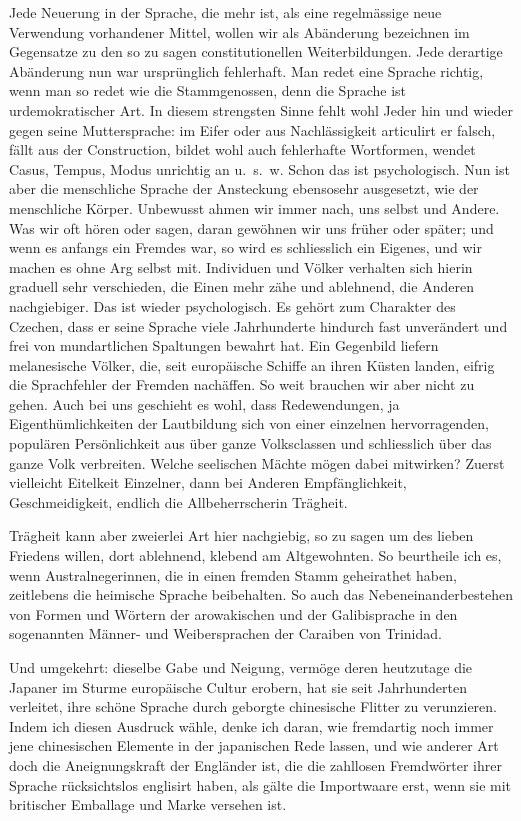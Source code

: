 Jede Neuerung in der Sprache, die mehr ist, als eine regelmässige neue Verwendung vorhandener Mittel, wollen wir als Abänderung bezeichnen im Gegensatze zu den so zu sagen constitutionellen Weiterbildungen. Jede derartige Abänderung nun war ursprünglich fehlerhaft. Man redet eine Sprache richtig, wenn man so redet wie die Stammgenossen, denn die Sprache ist urdemokratischer Art. In diesem strengsten Sinne fehlt wohl Jeder hin und wieder gegen seine Muttersprache: im Eifer oder aus Nachlässigkeit articulirt er falsch, fällt aus der Construction, bildet wohl auch fehlerhafte Wortformen, wendet Casus, Tempus, Modus unrichtig an u.~s.~w. Schon das ist psychologisch. Nun ist aber die menschliche Sprache der Ansteckung ebensosehr ausgesetzt, wie der menschliche Körper. Unbewusst ahmen wir immer nach, uns selbst und Andere. Was wir oft hören oder sagen, daran gewöhnen wir uns \label{fp.407} früher oder später; und wenn es anfangs ein Fremdes war, so wird es schliesslich ein Eigenes, und wir machen es ohne Arg selbst mit. Individuen und Völker verhalten sich hierin graduell sehr verschieden, die Einen mehr zähe und ablehnend, die Anderen nachgiebiger. Das ist wieder psychologisch. Es gehört zum Charakter des Czechen, dass er seine Sprache viele Jahrhunderte hindurch fast unverändert und frei von mundartlichen Spaltungen bewahrt hat. Ein Gegenbild liefern melanesische Völker, die, seit europäische Schiffe an ihren Küsten landen, eifrig die Sprachfehler der Fremden nachäffen. So weit brauchen wir aber nicht zu gehen. Auch bei uns geschieht es wohl, dass Redewendungen, ja Eigenthümlichkeiten der Lautbildung sich von einer einzelnen hervorragenden, populären Persönlichkeit aus über ganze Volksclassen und schliesslich über das ganze Volk verbreiten. Welche seelischen Mächte mögen dabei mitwirken? Zuerst vielleicht Eitelkeit Einzelner, dann bei Anderen Empfänglichkeit, Geschmeidigkeit, endlich die Allbeherrscherin Trägheit.

Trägheit kann aber zweierlei Art  hier nachgiebig, so zu sagen um des lieben Friedens willen, dort ablehnend, klebend am Altgewohnten. So beurtheile ich es, wenn Australnegerinnen, die in einen fremden Stamm geheirathet haben, zeitlebens die heimische Sprache beibehalten. So auch das Nebeneinanderbestehen von Formen und Wörtern der arowakischen und der Galibisprache in den sogenannten Männer- und Weibersprachen der Caraiben von Trinidad.

Und umgekehrt: dieselbe Gabe und Neigung, vermöge deren heutzutage die Japaner im Sturme europäische Cultur erobern, hat sie seit Jahrhunderten verleitet, ihre schöne Sprache durch geborgte chinesische Flitter zu verunzieren. Indem ich diesen Ausdruck wähle, denke ich daran, wie fremdartig noch immer jene chinesischen Elemente in der japanischen Rede lassen, und wie anderer \label{sp.429} Art doch die Aneignungskraft der Engländer ist, die die zahllosen Fremdwörter ihrer Sprache rücksichtslos englisirt haben, als gälte die Importwaare erst, wenn sie mit britischer Emballage und Marke versehen ist.

